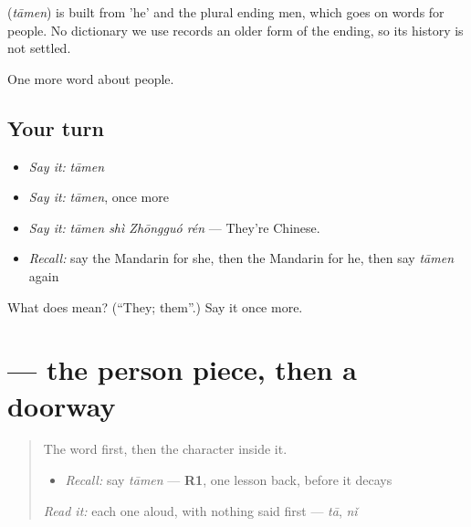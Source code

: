 \begin{cousinweb}
\textbf{} (\emph{tāmen}) is built from  'he' and the plural ending men, which goes on words for people. No dictionary we use records an older form of the ending, so its history is not settled.
\end{cousinweb}

\begin{grammarlens}[title={What you've built}]
One more word about people.
\end{grammarlens}

\subsection*{Your turn}
\begin{itemize}
\raggedright
  \item \emph{Say it:} \emph{tāmen}
  \item \emph{Say it:} \emph{tāmen}, once more
  \item \emph{Say it:} \emph{tāmen shì Zhōngguó rén} — They're Chinese.
  \item \emph{Recall:} say the Mandarin for she, then the Mandarin for he, then say \emph{tāmen} again
\end{itemize}

\begin{tcolorbox}[breakable,colback=teal!4,colframe=teal!35!black,title={Before you move on}]
What does  mean? (\textquotedblleft{}They; them\textquotedblright{}.) Say it once more.
\end{tcolorbox}
\section[\texorpdfstring{\zh{们} (men)}{们 (men)}]{ — the person piece, then a doorway}

\label{lesson:ZH-W31-men}



\begin{quote}
The word first, then the character inside it.

\begin{itemize}
\raggedright
  \item \emph{Recall:} say \emph{tāmen} — \textbf{R1}, one lesson back, before it decays
\end{itemize}

\begin{quote}
 
\end{quote}

\emph{Read it:} each one aloud, with nothing said first — \emph{tā}, \emph{nǐ}
\end{quote}

